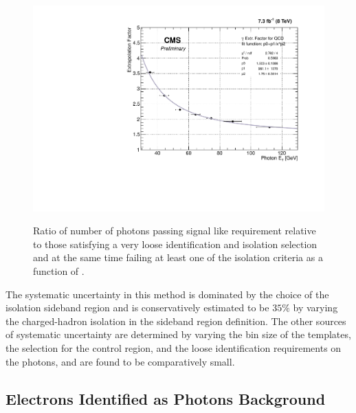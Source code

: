 \begin{figure}[H]
\centering
{\includegraphics[scale=0.6]{figures/fitResult.pdf}}
\caption{ Ratio of number of photons passing signal like requirement relative to those satisfying a very loose identification and isolation selection and at the same time failing at least one of the isolation criteria as a function of \etg.}
\label{fig:qcd_fr}
\end{figure}

  The systematic uncertainty in this method is dominated by the choice of the isolation sideband region and is conservatively estimated to be $35\%$ by varying the  charged-hadron isolation in the sideband region definition. The other sources of systematic uncertainty are determined by varying the bin size of the templates, the \met selection for the control region, and the loose identification requirements on the photons, and are found to be comparatively small.

\subsection{Electrons Identified as Photons Background}
\label{sec:ewk}

